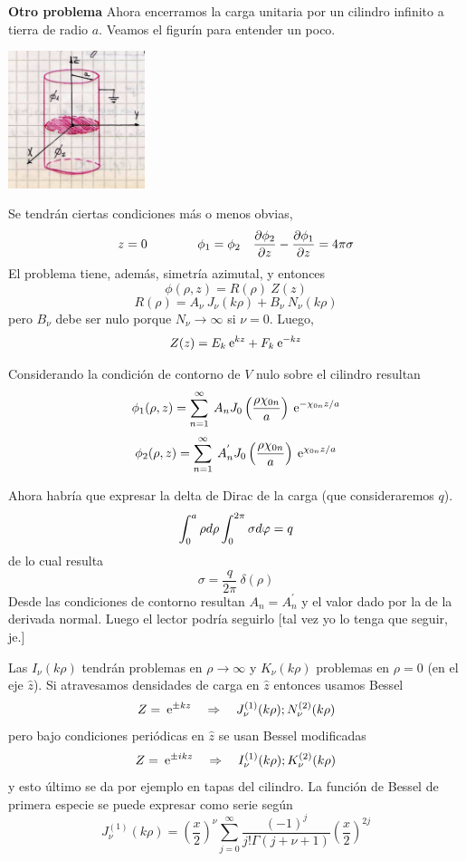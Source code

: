 \documentclass[10pt,oneside]{CBFT_book}
\begin{document}
\begin{ejemplo}{\bf Otro problema}
Ahora encerramos la carga unitaria por un cilindro infinito a tierra de radio $a$.
Veamos el figurín para entender un poco.

\includegraphics[width=0.3\textwidth]{images/fig_ft1_ejdisco_cilindro.jpg} 

Se tendrán ciertas condiciones más o menos obvias,
\[
	z=0 \qquad\qquad  \phi_1 = \phi_2 \quad \frac{\partial^{\hspace{-0.05em}} {\phi_2}}{\partial {z}^{\hspace{-0.05em}}} - \frac{\partial^{\hspace{-0.05em}} {\phi_1}}{\partial {z}^{\hspace{-0.05em}}} = 4 \pi \sigma
\]
El problema tiene, además, simetría azimutal, y entonces
\[
	\phi(\rho,z) = R(\rho) \: Z(z)
\]
\[
	R(\rho) = A_\nu \:J_\nu(k\rho) + B_\nu \: N_\nu(k\rho)
\]
pero $B_\nu$ debe ser nulo porque $N_\nu \to \infty$ si $\nu=0$. Luego,
\[
	Z(z) = E_k \:\mathrm{e}^{kz} + F_k \:\mathrm{e}^{-kz}
\]

Considerando la condición de contorno de $V$ nulo sobre el cilindro resultan
\[
	\phi_1(\rho,z)  = \sum_{n=1}^\infty \: 
	A_n J_0\left( \frac{\rho \chi_{0n}}{a}\right) \:\mathrm{e}^{-\chi_{0n}z/a}
\]
\[
	\phi_2(\rho,z)  = \sum_{n=1}^\infty \: 
	A_n^{'} J_0\left( \frac{\rho \chi_{0n}}{a}\right) \:\mathrm{e}^{\chi_{0n}z/a}
\]

Ahora habría que expresar la delta de Dirac de la carga (que consideraremos $q$).
\[
	\int_0^a \rho d\rho \int_0^{2\pi} \sigma d\varphi = q
\]
de lo cual resulta
\[
	\sigma = \frac{q}{2\pi} \: \delta(\rho)
\]
Desde las condiciones de contorno resultan $A_n=A_n^{'}$ y el valor dado por la
de la derivada normal. Luego el lector podría seguirlo [tal vez yo lo tenga que
seguir, je.]
 
\end{ejemplo}





Las $I_\nu(k\rho)$ tendrán problemas en $\rho\to\infty$ y $K_\nu(k\rho)$ problemas en $\rho=0$ (en el eje 
$\hat{z}$).
Si atravesamos densidades de carga en $\hat{z}$ entonces usamos Bessel
\[
	Z = \:\mathrm{e}^{\pm k z} \quad \Rightarrow \quad J_\nu^{(1)}(k\rho) ; N_\nu^{(2)}(k\rho)
\]
pero bajo condiciones periódicas en $\hat{z}$ se usan Bessel modificadas
\[
	Z = \:\mathrm{e}^{ \pm i k z} \quad \Rightarrow \quad I_\nu^{(1)}(k\rho) ; K_\nu^{(2)}(k\rho)
\]
y esto último se da por ejemplo en tapas del cilindro.
La función de Bessel de primera especie se puede expresar como serie según
\[
	J_\nu^{(1)}(k\rho) = \left(\frac{x}{2}\right)^\nu \sum_{j=0}^\infty \frac{(-1)^j}{j!\Gamma(j+\nu +1)} 
		\left(\frac{x}{2}\right)^{2j}
\]
\end{document}
